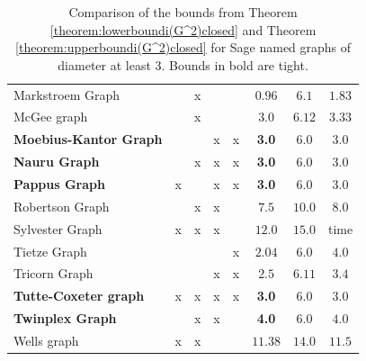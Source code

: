 \documentclass[a4paper,11pt]{article}
\theoremstyle{definition}
\begin{document}
\begin{table}[H]
\begin{tabular}{l|c|ccc|c|c|c}
    Markstroem Graph &  & x &  &  & $0.96$ & $6.1$ & $1.83$ \\
    McGee graph &  & x &  &  & $3.0$ & $6.12$ & $3.33$ \\
    \textbf{Moebius-Kantor Graph} &  &  & x & x & \textbf{3.0} & $6.0$ & $3.0$ \\
    \textbf{Nauru Graph} &  & x & x & x & \textbf{3.0} & $6.0$ & $3.0$ \\
    \textbf{Pappus Graph} & x &  & x & x & \textbf{3.0} & $6.0$ & $3.0$ \\
    Robertson Graph &  & x & x &  & $7.5$ & $10.0$ & $8.0$ \\
    Sylvester Graph & x & x & x &  & $12.0$ & $15.0$ & time \\
    Tietze Graph &  &  &  & x & $2.04$ & $6.0$ & $4.0$ \\
    Tricorn Graph &  &  & x & x & $2.5$ & $6.11$ & $3.4$ \\
    \textbf{Tutte-Coxeter graph} & x & x & x & x & \textbf{3.0} & $6.0$ & $3.0$ \\
    \textbf{Twinplex Graph} &  & x & x &  & \textbf{4.0} & $6.0$ & $4.0$ \\
    Wells graph & x & x &  &  & $11.38$ & $14.0$ & $11.5$ \\
    \end{tabular}
    \caption{Comparison of the bounds from Theorem \ref{theorem:lowerboundi(G^2)closed} and Theorem \ref{theorem:upperboundi(G^2)closed} for Sage named graphs of diameter at least 3. Bounds in bold are tight.}
    \label{tab:t2_sim}
\end{table}
\end{document}
